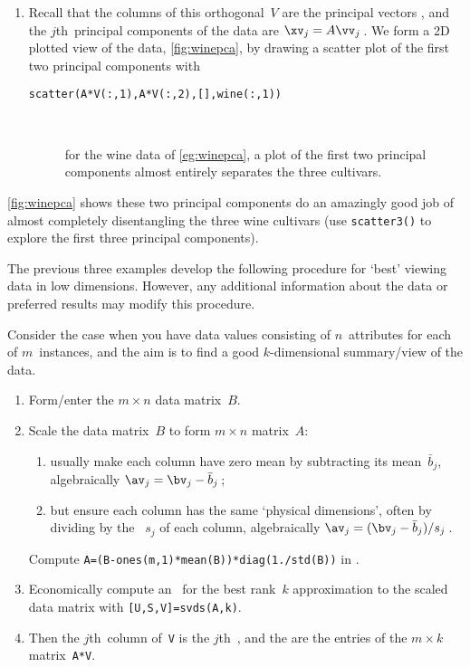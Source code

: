 \begin{example}
\begin{solution}
\begin{enumerate}
\item Recall that the columns of this orthogonal~\(V\) are the principal vectors \hlist{}, and the \(j\)th~principal components of the data are \(\xv_j=A\vv_j\)\,.
We form a 2D plotted view of the data, \autoref{fig:winepca}, by drawing a scatter plot of the first two principal components with 
\begin{verbatim}
scatter(A*V(:,1),A*V(:,2),[],wine(:,1))
\end{verbatim}
\begin{figure}
\centering
\\
\caption{for the wine data of \autoref{eg:winepca}, a plot of the first two principal components almost entirely separates the three cultivars.}
\label{fig:winepca}
\end{figure}
\end{enumerate}
\autoref{fig:winepca} shows these two principal components do an amazingly good job of almost completely disentangling the three wine cultivars (use \verb|scatter3()| to explore the first three principal components).
\end{solution}
\end{example}


The previous three examples develop the following procedure for `best' viewing data in low dimensions.
However, any additional information about the data or preferred results may modify this procedure. 


\begin{procedure} \label{pro:pca}
Consider the case when you have data values consisting of \(n\)~attributes for each of \(m\)~instances, and the aim is to find a good \(k\)-dimensional summary\slash view of the data. 
\begin{enumerate}
\item Form\slash enter the \(m\times n\) data matrix~\(B\).
\item {}Scale the data matrix~\(B\) to form \(m\times n\) matrix~\(A\):
\begin{enumerate}
\item usually make each column have zero mean by subtracting its mean~\(\bar b_j\), algebraically \(\av_j=\bv_j-\bar b_j\)\,;
\item but ensure each column has the same `physical dimensions', often by dividing by the ~\(s_j\) of each column, algebraically \(\av_j=(\bv_j-\bar b_j)/s_j\)\,.
\end{enumerate}
Compute \verb|A=(B-ones(m,1)*mean(B))*diag(1./std(B))| in \script.
\item  Economically compute an \svd\ for the best rank~\(k\) approximation to the scaled data matrix with \verb|[U,S,V]=svds(A,k)|.
\item Then the \(j\)th~column of~\verb|V| is the \(j\)th~, and the  are the entries of the \(m\times k\) matrix~\verb|A*V|.
\end{enumerate}
\end{procedure}




